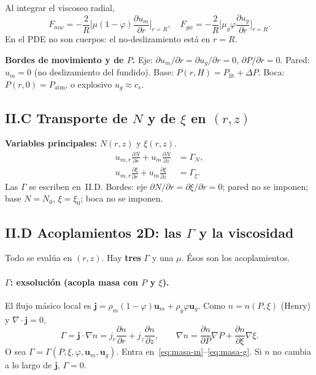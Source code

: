 \documentclass[11pt,a4paper]{article}
\newcommand{\p}{\partial}
\begin{document}
Al integrar el viscoseo radial,
\begin{equation}
\label{eq:Fmw}
F_{mw}
=-\frac{2}{R}\Biggl[\mu(1-\varphi)\frac{\p u_m}{\p r}\Biggr]_{r=R},
\quad
F_{gw}
=-\frac{2}{R}\Biggl[\mu_g\varphi\frac{\p u_g}{\p r}\Biggr]_{r=R}.
\end{equation}
En el PDE no son cuerpos: el no-deslizamiento está en $r=R$.

\textbf{Bordes de movimiento y de $P$.}
Eje: $\p u_m/\p r=\p u_g/\p r=0$, $\p P/\p r=0$.
Pared: $u_m=0$ (no deslizamiento del fundido).
Base: $P(r,H)=P_{\mathrm{lit}}+\Delta P$.
Boca: $P(r,0)=P_{\mathrm{atm}}$, o explosivo
$u_g\approx c_s$.

\subsection*{II.C Transporte de $N$ y de $\xi$ en $(r,z)$}

\textbf{Variables principales:} $N(r,z)$ y $\xi(r,z)$.
\begin{align}
\label{eq:Nxi-2d}
u_{m,r}\frac{\p N}{\p r}+u_m\frac{\p N}{\p z}
&=\Gamma_N,
\\
u_{m,r}\frac{\p \xi}{\p r}+u_m\frac{\p \xi}{\p z}
&=\Gamma_\xi.
\end{align}
Las $\Gamma$ se escriben en~II.D. Bordes: eje
$\p N/\p r=\p \xi/\p r=0$; pared no se imponen; base
$N=N_0$, $\xi=\xi_0$; boca no se imponen.

\subsection*{II.D Acoplamientos 2D: las $\Gamma$ y la viscosidad}

Todo se evalúa en $(r,z)$. Hay \textbf{tres} $\Gamma$ y una
$\mu$. Ésos son los acoplamientos.

\paragraph{$\Gamma$: exsolución (acopla masa con $P$ y $\xi$).}
El flujo másico local es
$\mathbf{j}
=\rho_m(1-\varphi)\mathbf{u}_m
+\rho_g\varphi\mathbf{u}_g$.
Como $n=n(P,\xi)$ (Henry) y $\nabla\cdot\mathbf{j}=0$,
\begin{equation}
\label{eq:Gamma-exs}
\Gamma
=\mathbf{j}\cdot\nabla n
=j_r\frac{\p n}{\p r}+j_z\frac{\p n}{\p z},
\qquad
\nabla n
=\frac{\p n}{\p P}\nabla P
+\frac{\p n}{\p \xi}\nabla \xi.
\end{equation}
O sea
$\Gamma=\Gamma(P,\xi,\varphi,\mathbf{u}_m,\mathbf{u}_g)$.
Entra en~\eqref{eq:masa-m}--\eqref{eq:masa-g}. Si $n$ no
cambia a lo largo de $\mathbf{j}$, $\Gamma=0$.
\end{document}
